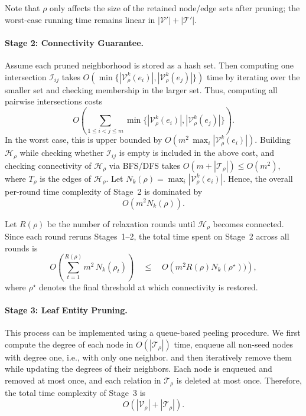 Note that $\rho$ only affects the size of the retained node/edge sets after pruning; the worst-case running time remains linear in $|\mathcal V'|+|\mathcal T'|$.

\paragraph{Stage 2: Connectivity Guarantee.}
Assume each pruned neighborhood is stored as a hash set.
Then computing one intersection $\mathcal I_{ij}$ takes
$O(\min\{|\mathcal V^k_\rho(e_i)|, |\mathcal V^k_\rho(e_j)|\})$ time by iterating over the smaller set and checking membership in the larger set.
Thus, computing all pairwise intersections costs
\[
O\!\left(\sum_{1\le i<j\le m}\min\Big\{|\mathcal V^k_\rho(e_i)|, |\mathcal V^k_\rho(e_j)|\Big\}\right).
\]
In the worst case, this is upper bounded by
$
O(m^2\,\max_i |\mathcal V^k_\rho(e_i)|).
$
Building $\mathcal H_\rho$ while checking whether $\mathcal I_{ij}$ is empty is included in the above cost, and checking connectivity of $\mathcal H_\rho$ via BFS/DFS takes
$O(m+|\mathcal T_\rho|)\le O(m^2)$,
where $T_\rho$ is the edges of $\mathcal H_\rho$.
Let
$
N_k(\rho)=\max_i |\mathcal V^k_\rho(e_i)|
$. Hence, the overall per-round time complexity of Stage~2 is dominated by
\[
O(m^2 N_k(\rho)).
\]

Let $R(\rho)$ be the number of relaxation rounds until $\mathcal H_\rho$ becomes connected.
Since each round reruns Stages~1--2, the total time spent on Stage~2 across all rounds is
\[
O\!\left(\sum_{t=1}^{R(\rho)} m^2\,N_k(\rho_t)\right)
\quad\le\quad
O\!\left(m^2 R(\rho)  N_k(\rho^\star))\right),
\]
where $\rho^\star$ denotes the final threshold at which connectivity is restored.

\paragraph{Stage 3: Leaf Entity Pruning.}
This process can be implemented using a queue-based peeling procedure.
We first compute the degree of each node in $O(|\mathcal T_\rho|)$ time, enqueue all non-seed nodes with degree one, i.e., with only one neighbor. and then iteratively remove them while updating the degrees of their neighbors.
Each node is enqueued and removed at most once, and each relation in $\mathcal T_\rho$ is deleted at most once.
Therefore, the total time complexity of Stage~3 is
\[
O\!\left(|\mathcal V_\rho| + |\mathcal T_\rho|\right).
\]

